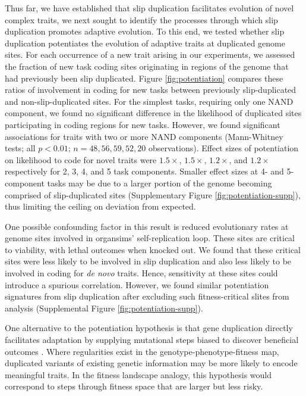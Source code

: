 Thus far, we have established that slip duplication facilitates evolution of novel complex traits, we next sought to identify the processes through which slip duplication promotes adaptive evolution.
To this end, we tested whether slip duplication potentiates the evolution of adaptive traits at duplicated genome sites.
For each occurrence of a new trait arising in our experiments, we assessed the fraction of new task coding sites originating in regions of the genome that had previously been slip duplicated.
Figure \ref{fig:potentiation} compares these ratios of involvement in coding for new tasks between previously slip-duplicated and non-slip-duplicated sites.
For the simplest tasks, requiring only one NAND component, we found no significant difference in the likelihood of duplicated sites participating in coding regions for new tasks.
However, we found significant associations for traits with two or more NAND components (Mann-Whitney tests; all $p < 0.01$; $n=48,56,59,52,20$ observations).
Effect sizes of potentiation on likelihood to code for novel traits were $1.5\times$, $1.5\times$, $1.2\times$, and $1.2\times$ respectively for 2, 3, 4, and 5 task components.
Smaller effect sizes at 4- and 5-component tasks may be due to a larger portion of the genome becoming comprised of slip-duplicated sites (Supplementary Figure \ref{fig:potentiation-supp}), thus limiting the ceiling on deviation from expected.

One possible confounding factor in this result is reduced evolutionary rates at genome sites involved in organsims' self-replication loop.
These sites are critical to viability, with lethal outcomes when knocked out.
We found that these critical sites were less likely to be involved in slip duplication and also less likely to be involved in coding for \textit{de novo} traits.
Hence, sensitivity at these sites could introduce a spurious correlation.
However, we found similar potentiation signatures from slip duplication after excluding such fitness-critical slites from analysis (Supplemental Figure \ref{fig:potentiation-supp}).

One alternative to the potentiation hypothesis is that gene duplication directly facilitates adaptation by supplying mutational steps biased to discover beneficial outcomes \citep{kondrashov2012gene}.
Where regularities exist in the genotype-phenotype-fitness map, duplicated variants of existing genetic information may be more likely to encode meaningful traits.
In the fitness landscape analogy, this hypothesis would correspond to steps through fitness space that are larger but less risky.

